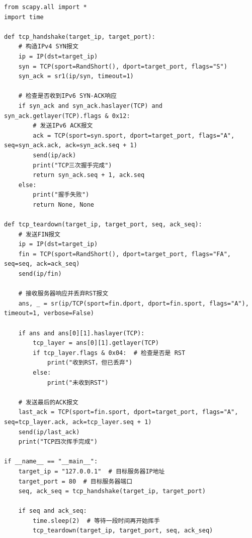 \documentclass[UTF8,titlepage]{ctexart}
\numberwithin{figure}{section}
\begin{document}
\begin{verbatim}
from scapy.all import *
import time

def tcp_handshake(target_ip, target_port):
    # 构造IPv4 SYN报文
    ip = IP(dst=target_ip)
    syn = TCP(sport=RandShort(), dport=target_port, flags="S")
    syn_ack = sr1(ip/syn, timeout=1)

    # 检查是否收到IPv6 SYN-ACK响应
    if syn_ack and syn_ack.haslayer(TCP) and syn_ack.getlayer(TCP).flags & 0x12:
        # 发送IPv6 ACK报文
        ack = TCP(sport=syn.sport, dport=target_port, flags="A", seq=syn_ack.ack, ack=syn_ack.seq + 1)
        send(ip/ack)
        print("TCP三次握手完成")
        return syn_ack.seq + 1, ack.seq
    else:
        print("握手失败")
        return None, None

def tcp_teardown(target_ip, target_port, seq, ack_seq):
    # 发送FIN报文
    ip = IP(dst=target_ip)
    fin = TCP(sport=RandShort(), dport=target_port, flags="FA", seq=seq, ack=ack_seq)
    send(ip/fin)

    # 接收服务器响应并丢弃RST报文
    ans, _ = sr(ip/TCP(sport=fin.dport, dport=fin.sport, flags="A"), timeout=1, verbose=False)
    
    if ans and ans[0][1].haslayer(TCP):
        tcp_layer = ans[0][1].getlayer(TCP)
        if tcp_layer.flags & 0x04:  # 检查是否是 RST
            print("收到RST，但已丢弃")
        else:
            print("未收到RST")

    # 发送最后的ACK报文
    last_ack = TCP(sport=fin.sport, dport=target_port, flags="A", seq=tcp_layer.ack, ack=tcp_layer.seq + 1)
    send(ip/last_ack)
    print("TCP四次挥手完成")

if __name__ == "__main__":
    target_ip = "127.0.0.1"  # 目标服务器IP地址
    target_port = 80  # 目标服务器端口
    seq, ack_seq = tcp_handshake(target_ip, target_port)

    if seq and ack_seq:
        time.sleep(2)  # 等待一段时间再开始挥手
        tcp_teardown(target_ip, target_port, seq, ack_seq)
\end{verbatim}
\end{document}
